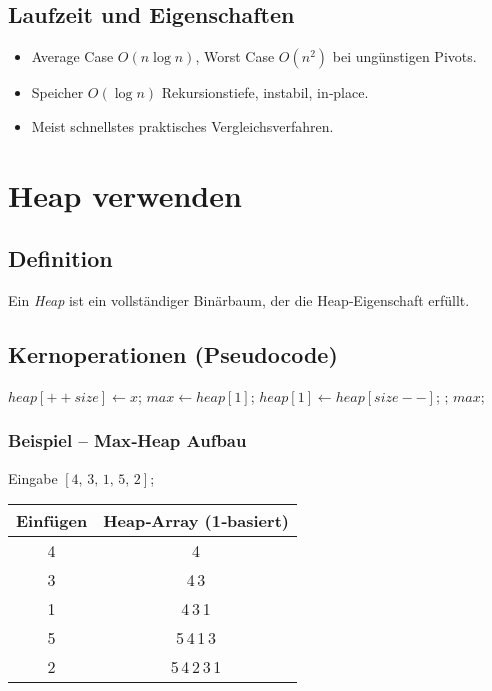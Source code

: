 \subsection*{Laufzeit und Eigenschaften}
\begin{itemize}
  \item Average Case $O(n\log n)$, Worst Case $O(n^{2})$ bei ungünstigen Pivots.\par
  \item Speicher $O(\log n)$ Rekursionstiefe, instabil, in‑place.\par
  \item Meist schnellstes praktisches Vergleichsverfahren.
\end{itemize}

\section{Heap verwenden}
\subsection*{Definition}
Ein \emph{Heap} ist ein vollständiger Binärbaum, der die Heap‑Eigenschaft erfüllt.

\subsection*{Kernoperationen (Pseudocode)}
\begin{algorithmic}
  \State $heap[++size] \gets x$; 
\EndFunction
{}
  \State $max \gets heap[1]$; $heap[1] \gets heap[size--]$;
  \State {}; \Return $max$;
\EndFunction
\end{algorithmic}

\subsubsection*{Beispiel – Max‑Heap Aufbau}
Eingabe \([4,\,3,\,1,\,5,\,2]\);
\begin{center}
\begin{tabular}{c|c}
Einfügen & Heap‑Array (1‑basiert)\\\hline
4 & 4\\
3 & 4\,3\\
1 & 4\,3\,1\\
5 & 5\,4\,1\,3\\
2 & 5\,4\,2\,3\,1
\end{tabular}
\end{center}

